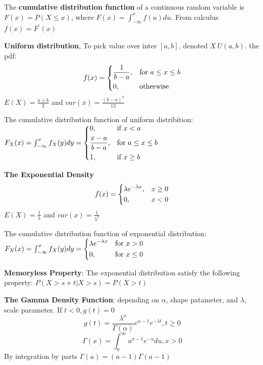 \documentclass{article}
\begin{document}
\begin{multicols*}{2}
    The \textbf{cumulative distribution function} of a continuous random variable is $F(x) = P(X \leq x)$, where $F(x) = \int^x_{-\infty}f(u)du$.
    From calculus $f(x) = F^\prime(x)$

    \textbf{Uniform distribution}, To pick value over inter $\left[a, b\right]$, denoted $X~U(a, b)$. the pdf:
    \[
        f(x) =\begin{dcases}
            \frac{1}{b-a}, & \text{for } a \leq x \leq b \\
            0,             & \text{otherwise}            \\
        \end{dcases}
    \]
    $E(X) = \frac{a+b}{2}$ and $var(x) = \frac{(b-a)^2}{12}$

    The cumulative distribution function of uniform distribition:
    $F_X(x) = \int_{-\infty}^xf_X(y)dy = \begin{dcases}
            0,               & \text{if } x < a            \\
            \frac{x-a}{b-a}, & \text{for } a \leq x \leq b \\
            1,               & \text{if } x \geq b         \\
        \end{dcases}$

    \textbf{The Exponential Density}
    \[
        f(x) =\begin{dcases}
            \lambda e^{-\lambda x}, & x \geq 0 \\
            0,                      & x < 0    \\
        \end{dcases}
    \]
    $E(X) = \frac{1}{\lambda}$ and $var(x) = \frac{1}{\lambda^2}$

    The cumulative distribution function of exponential distribution:
    $F_X(x) = \int_{-\infty}^xf_X(y)dy = \begin{dcases}
            \lambda e^{-\lambda x} & \text{for } x > 0    \\
            0,                     & \text{for } x \leq 0 \\
        \end{dcases}$

    \textbf{Memoryless Property}: The exponential distribution satisfy the following property: $P(X > s+t | X>s) = P(X > t)$

    \textbf{The Gamma Density Function}: depending on $\alpha$, shape patameter, and $\lambda$, scale parameter. If $t < 0, g(t) = 0$
    \[
        g(t) = \frac{\lambda^a}{\Gamma(\alpha)}e^{\alpha-1}r^{-\lambda t}, t \geq 0
    \]
    \[
        \Gamma(x) = \int^\infty_0 u^{x-1}e^{-u} du, x > 0
    \]
    By integration by parts $\Gamma(a) = (a-1)\Gamma(a-1)$


\end{multicols*}
\end{document}
